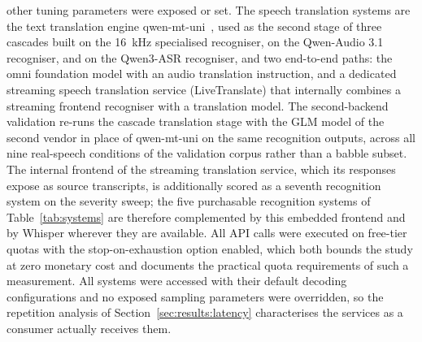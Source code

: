 other tuning parameters were exposed or set. The speech translation systems are the text translation
engine qwen-mt-uni~\citep{qwenmtcard}, used as the second stage of three cascades built on the
16~kHz specialised recogniser, on the Qwen-Audio 3.1 recogniser, and on the
Qwen3-ASR recogniser, and two
end-to-end paths: the omni foundation model with an audio translation
instruction, and a dedicated streaming speech translation service
(LiveTranslate) that internally combines a streaming frontend recogniser
with a translation model. The second-backend validation re-runs the cascade
translation stage with the GLM model of the second vendor in place of
qwen-mt-uni on the same
recognition outputs, across all nine real-speech
conditions of the validation corpus rather than a babble subset. The internal frontend of the streaming translation
service, which its responses expose as source transcripts, is additionally
scored as a seventh recognition system on the severity sweep; the five
purchasable recognition systems of Table~\ref{tab:systems} are therefore
complemented by this embedded frontend and by Whisper wherever they are
available. All API calls were executed on
free-tier quotas with the stop-on-exhaustion option enabled, which both
bounds the study at zero monetary cost and documents the practical quota
requirements of such a measurement. All systems were accessed with their
default decoding configurations and no exposed sampling parameters were
overridden, so the repetition analysis of Section~\ref{sec:results:latency}
characterises the services as a consumer actually receives them.


